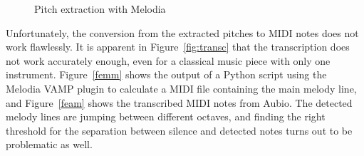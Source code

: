 \begin{figure}[htbp]
	\centering
	\caption{Pitch extraction with Melodia}
	\label{fig:melodia}
\end{figure}

\noindent Unfortunately, the conversion from the extracted pitches to MIDI notes does not work flawlessly. It is apparent in Figure~\ref{fig:transc} that the transcription does not work accurately enough, even for a classical music piece with only one instrument. Figure~\ref{femm} shows the output of a Python script using the Melodia VAMP plugin to calculate a MIDI file containing the main melody line, and Figure~\ref{feam} shows the transcribed MIDI notes from Aubio. The detected melody lines are jumping between different octaves, and finding the right threshold for the separation between silence and detected notes turns out to be problematic as well.

